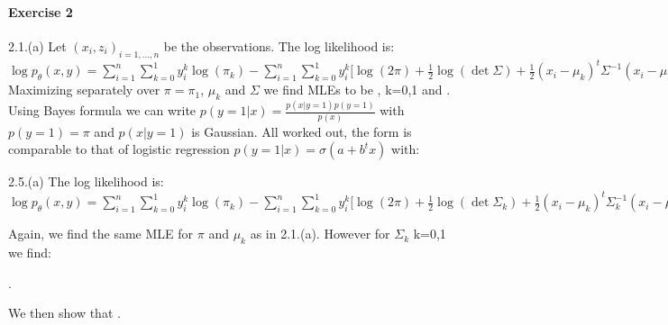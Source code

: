 \documentclass[a4paper, 11pt]{article}
\begin{document}
\paragraph{Exercise 2}

2.1.(a) Let $(x_i, z_i)_{i=1,\dots,n}$ be the observations. The log likelihood is: \\

$\log p_{\theta}(x, y) =\sum_{i=1}^n \sum_{k=0}^1 y_i^k \log(\pi_k) - \sum_{i=1}^n \sum_{k=0}^1 y_i^k \big[ \log(2\pi)
+ \frac{1}{2} \log(\det \Sigma) + \frac{1}{2} (x_i - \mu_k)^t \Sigma^{-1} (x_i-\mu_k) \big] $\\

Maximizing separately over $\pi=\pi_1$, $\mu_k$ and $\Sigma$ we find MLEs to be ,  k=0,1 and . \\

Using Bayes formula we can write $p(y=1|x) = \frac{p(x|y=1)p(y=1)}{p(x)}$ with $p(y=1)=\pi$ and $p(x|y=1)$ is Gaussian.
All worked out, the form is comparable to that of logistic regression $p(y=1|x) = \sigma(a+b^tx)$ with:
\begin{center}  \end{center} 

2.5.(a) The log likelihood is:\\
$\log p_{\theta}(x, y) =\sum_{i=1}^n \sum_{k=0}^1 y_i^k \log(\pi_k) - \sum_{i=1}^n \sum_{k=0}^1 y_i^k \big[ \log(2\pi)
+ \frac{1}{2} \log(\det \Sigma_k) + \frac{1}{2} (x_i - \mu_k)^t \Sigma_k^{-1} (x_i-\mu_k) \big] $

Again, we find the same MLE for $\pi$ and $\mu_k$ as in 2.1.(a). However for $\Sigma_k$ k=0,1 we find:
\begin{center} . \end{center} 

We then show that .


\newpage
\end{document}
